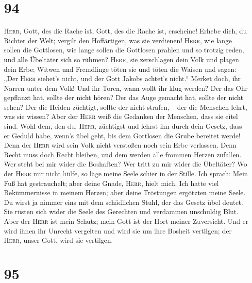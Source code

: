 \hypertarget{section-93}{%
\section{94}\label{section-93}}

 \textsc{Herr}, Gott, des die Rache ist, Gott, des die
Rache ist, erscheine!  Erhebe dich, du Richter der Welt;
vergilt den Hoffärtigen, was sie verdienen! 
\textsc{Herr}, wie lange sollen die Gottlosen, wie lange sollen die
Gottlosen prahlen  und so trotzig reden, und alle
Übeltäter sich so rühmen?  \textsc{Herr}, sie zerschlagen
dein Volk und plagen dein Erbe;  Witwen und Fremdlinge
töten sie und töten die Waisen  und sagen: „Der
\textsc{Herr} siehet's nicht, und der Gott Jakobs achtet's nicht.``
 Merket doch, ihr Narren unter dem Volk! Und ihr Toren,
wann wollt ihr klug werden?  Der das Ohr gepflanzt hat,
sollte der nicht hören? Der das Auge gemacht hat, sollte der nicht
sehen?  Der die Heiden züchtigt, sollte der nicht
strafen, -- der die Menschen lehrt, was sie wissen?  Aber
der \textsc{Herr} weiß die Gedanken der Menschen, dass sie eitel sind.
 Wohl dem, den du, \textsc{Herr}, züchtigst und lehrst
ihn durch dein Gesetz,  dass er Geduld habe, wenn's übel
geht, bis dem Gottlosen die Grube bereitet werde!  Denn
der \textsc{Herr} wird sein Volk nicht verstoßen noch sein Erbe
verlassen.  Denn Recht muss doch Recht bleiben, und dem
werden alle frommen Herzen zufallen.  Wer steht bei mir
wider die Boshaften? Wer tritt zu mir wider die Übeltäter?
 Wo der \textsc{Herr} mir nicht hülfe, so läge meine
Seele schier in der Stille.  Ich sprach: Mein Fuß hat
gestrauchelt; aber deine Gnade, \textsc{Herr}, hielt mich.
 Ich hatte viel Bekümmernisse in meinem Herzen; aber
deine Tröstungen ergötzten meine Seele.  Du wirst ja
nimmer eins mit dem schädlichen Stuhl, der das Gesetz übel deutet.
 Sie rüsten sich wider die Seele des Gerechten und
verdammen unschuldig Blut.  Aber der \textsc{Herr} ist
mein Schutz; mein Gott ist der Hort meiner Zuversicht. 
Und er wird ihnen ihr Unrecht vergelten und wird sie um ihre Bosheit
vertilgen; der \textsc{Herr}, unser Gott, wird sie vertilgen.

\hypertarget{section-94}{%
\section{95}\label{section-94}}


